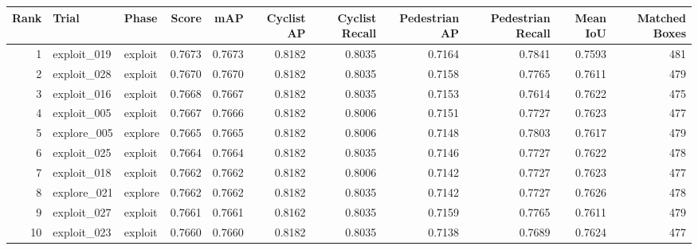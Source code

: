 \begin{tabular}{rllrrrrrrrr}
\toprule
Rank & Trial & Phase & Score & mAP & Cyclist AP & Cyclist Recall & Pedestrian AP & Pedestrian Recall & Mean IoU & Matched Boxes \\
\midrule
1 & exploit_019 & exploit & 0.7673 & 0.7673 & 0.8182 & 0.8035 & 0.7164 & 0.7841 & 0.7593 & 481 \\
2 & exploit_028 & exploit & 0.7670 & 0.7670 & 0.8182 & 0.8035 & 0.7158 & 0.7765 & 0.7611 & 479 \\
3 & exploit_016 & exploit & 0.7668 & 0.7667 & 0.8182 & 0.8035 & 0.7153 & 0.7614 & 0.7622 & 475 \\
4 & exploit_005 & exploit & 0.7667 & 0.7666 & 0.8182 & 0.8006 & 0.7151 & 0.7727 & 0.7623 & 477 \\
5 & explore_005 & explore & 0.7665 & 0.7665 & 0.8182 & 0.8006 & 0.7148 & 0.7803 & 0.7617 & 479 \\
6 & exploit_025 & exploit & 0.7664 & 0.7664 & 0.8182 & 0.8035 & 0.7146 & 0.7727 & 0.7622 & 478 \\
7 & exploit_018 & exploit & 0.7662 & 0.7662 & 0.8182 & 0.8006 & 0.7142 & 0.7727 & 0.7623 & 477 \\
8 & explore_021 & explore & 0.7662 & 0.7662 & 0.8182 & 0.8035 & 0.7142 & 0.7727 & 0.7626 & 478 \\
9 & exploit_027 & exploit & 0.7661 & 0.7661 & 0.8162 & 0.8035 & 0.7159 & 0.7765 & 0.7611 & 479 \\
10 & exploit_023 & exploit & 0.7660 & 0.7660 & 0.8182 & 0.8035 & 0.7138 & 0.7689 & 0.7624 & 477 \\
\bottomrule
\end{tabular}
